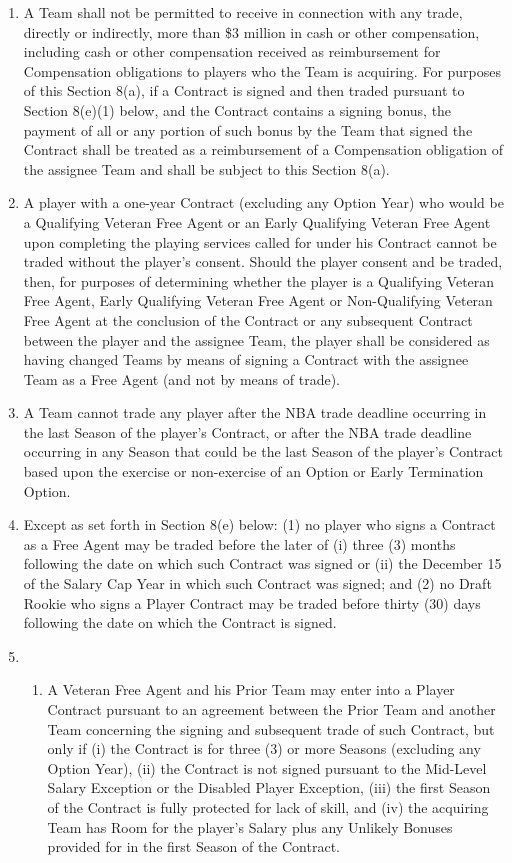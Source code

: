 \documentclass[
]{book}
\providecommand{\tightlist}{%
  \setlength{\itemsep}{0pt}\setlength{\parskip}{0pt}}
\begin{document}
\begin{enumerate}
\def\labelenumi{(\alph{enumi})}
\item
  A Team shall not be permitted to receive in connection with any trade, directly or indirectly, more than \$3 million in cash or other compensation, including cash or other compensation received as reimbursement for Compensation obligations to players who the Team is acquiring. For purposes of this Section 8(a), if a Contract is signed and then traded pursuant to Section 8(e)(1) below, and the Contract contains a signing bonus, the payment of all or any portion of such bonus by the Team that signed the Contract shall be treated as a reimbursement of a Compensation obligation of the assignee Team and shall be subject to this Section 8(a).
\item
  A player with a one-year Contract (excluding any Option Year) who would be a Qualifying Veteran Free Agent or an Early Qualifying Veteran Free Agent upon completing the playing services called for under his Contract cannot be traded without the player's consent. Should the player consent and be traded, then, for purposes of determining whether the player is a Qualifying Veteran Free Agent, Early Qualifying Veteran Free Agent or Non-Qualifying Veteran Free Agent at the conclusion of the Contract or any subsequent Contract between the player and the assignee Team, the player shall be considered as having changed Teams by means of signing a Contract with the assignee Team as a Free Agent (and not by means of trade).
\item
  A Team cannot trade any player after the NBA trade deadline occurring in the last Season of the player's Contract, or after the NBA trade deadline occurring in any Season that could be the last Season of the player's Contract based upon the exercise or non-exercise of an Option or Early Termination Option.
\item
  Except as set forth in Section 8(e) below: (1) no player who signs a Contract as a Free Agent may be traded before the later of (i) three (3) months following the date on which such Contract was signed or (ii) the December 15 of the Salary Cap Year in which such Contract was signed; and (2) no Draft Rookie who signs a Player Contract may be traded before thirty (30) days following the date on which the Contract is signed.
\item
  \begin{enumerate}
  \def\labelenumii{(\arabic{enumii})}
  \tightlist
  \item
    A Veteran Free Agent and his Prior Team may enter into a Player Contract pursuant to an agreement between the Prior Team and another Team concerning the signing and subsequent trade of such Contract, but only if (i) the Contract is for three (3) or more Seasons (excluding any Option Year), (ii) the Contract is not signed pursuant to the Mid-Level Salary Exception or the Disabled Player Exception, (iii) the first Season of the Contract is fully protected for lack of skill, and (iv) the acquiring Team has Room for the player's Salary plus any Unlikely Bonuses provided for in the first Season of the Contract.

\end{enumerate}
\end{enumerate}
\end{document}
